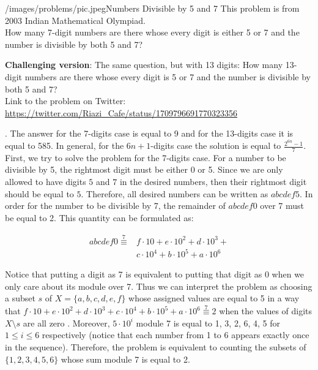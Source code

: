 \begin{problem}{/images/problems/pic.jpeg}{Numbers Divisible by 5 and 7}
	This problem is from 2003 Indian Mathematical Olympiad.\\[0.2cm]
	
	How many 7-digit numbers are there whose every digit is either 5 or 7 and the number is divisible by both 5 and 7?
	
	\textbf{Challenging version}: The same question, but with 13 digits: How many 13-digit numbers are there whose every digit is 5 or 7 and the number is divisible by both 5 and 7?\\[0.2cm]
	
Link to the problem on Twitter:  \url{https://twitter.com/Riazi_Cafe/status/1709796691770323356}
\end{problem}
\begin{solution}.
The answer for the 7-digits case is equal to 9 and for the 13-digits case it is equal to 585. In general, for the $6n+1$-digits case the solution is equal to $\frac{2^{6n}-1}{7}$.\\[0.2cm]

First, we try to solve the problem for the 7-digits case. For a number to be divisible by 5, the rightmost digit must be either 0 or 5. Since we are only allowed to have digits $5$ and $7$ in the desired numbers, then their rightmost digit should be equal to $5$. Therefore, all desired numbers can be written as $abcdef5$. In order for the  number to be divisible by 7, the remainder of $abcdef0$ over 7 must be equal to 2. This quantity can be formulated as:

$$
\begin{aligned}
abcdef0 \overset{7}{\equiv}  &f \cdot 10  + e \cdot 10^2  + d \cdot 10^3 + \\
&c \cdot 10^4  + b \cdot 10^5  + a \cdot 10^6 
\end{aligned}
$$

Notice that putting a digit as 7 is equivalent to putting that digit as 0 when we only care about its module over 7. Thus we can interpret the problem as choosing a subset $s$ of  $X = \{ a, b, c, d, e, f\}$ whose assigned values are equal to 5 in a way that $f \cdot 10  + e \cdot 10^2  + d \cdot 10^3 + 
c \cdot 10^4  + b \cdot 10^5  + a \cdot 10^6 \overset{7}{\equiv} 2$ when the values of digits $X \setminus s$ are all zero . Moreover, $5 \cdot 10^i$ module 7 is equal to 1, 3, 2, 6, 4, 5 for $1 \leq i \leq 6$ respectively (notice that each number from 1 to 6 appears exactly once in the sequence). Therefore, the  problem is equivalent to counting the subsets of $\{1, 2, 3, 4, 5, 6\}$ whose sum module 7 is equal to 2.


\end{solution}
